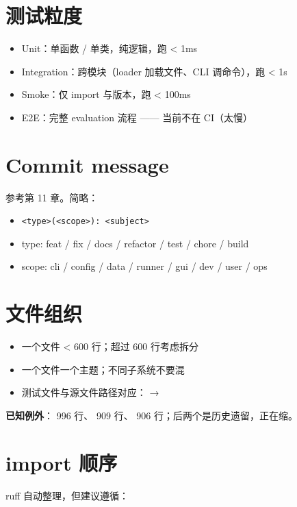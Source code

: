 \section{测试粒度}

\begin{itemize}
  \item Unit：单函数 / 单类，纯逻辑，跑 < 1ms
  \item Integration：跨模块（loader 加载文件、CLI 调命令），跑 < 1s
  \item Smoke：仅 import 与版本，跑 < 100ms
  \item E2E：完整 evaluation 流程 —— 当前不在 CI（太慢）
\end{itemize}

\section{Commit message}

参考第 11 章。简略：

\begin{itemize}
  \item \texttt{<type>(<scope>): <subject>}
  \item type: feat / fix / docs / refactor / test / chore / build
  \item scope: cli / config / data / runner / gui / dev / user / ops
\end{itemize}

\section{文件组织}

\begin{itemize}
  \item 一个文件 < 600 行；超过 600 行考虑拆分
  \item 一个文件一个主题；不同子系统不要混
  \item 测试文件与源文件路径对应： → 
\end{itemize}

\textbf{已知例外}： 996 行、 909 行、 906 行；后两个是历史遗留，正在缩。

\section{import 顺序}

ruff 自动整理，但建议遵循：


